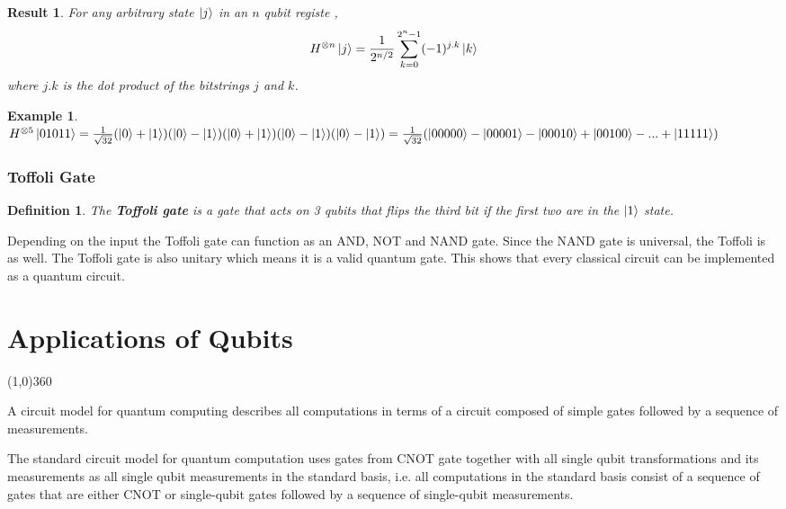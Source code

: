 \documentclass[12pt,twoside,fleqn]{report}
\theoremstyle{thmstyle}
\newtheorem{defn}{Definition}[chapter]
\newtheorem{eg}{Example}[chapter]
\newtheorem{result}{Result}[chapter]
\begin{document}
\begin{result}
    For any arbitrary state $\ket{j}$ in an $n$ qubit registe , \[ H^{\otimes n} \ket{j} = \frac{1}{2^{n/2}} \sum_{k=0}^{2^n-1} (-1)^{j.k} \ket{k}\] where $j.k$ is the dot product of the bitstrings $j$ and $k$.
\end{result}

\begin{eg}
    $H^{\otimes 5} \ket{01011} = \frac{1}{\sqrt{32}} (\ket{0} + \ket{1}) (\ket{0} - \ket{1}) (\ket{0} + \ket{1}) (\ket{0} - \ket{1}) (\ket{0} - \ket{1}) = \frac{1}{\sqrt{32}} ( \ket{00000} - \ket{00001} - \ket{00010} + \ket{00100} - ... + \ket{11111} )$
\end{eg}

\subsection{Toffoli Gate}
\begin{defn}
    The \textbf{Toffoli gate} is a gate that acts on 3 qubits that flips the third bit if the first two are in the $\ket{1}$ state.\\
\end{defn}

Depending on the input the Toffoli gate can function as an AND, NOT and NAND gate. Since the NAND gate is universal, the Toffoli is as well. The Toffoli gate is also unitary which means it is a valid quantum gate. This shows that every classical circuit can be implemented as a quantum circuit.



\chapter{Applications of Qubits}

\line(1,0){360} \\

\begin{comment}
To include:
* Quantum Teleportaion
* Quantum Algorithms can be abstracted as circuits, and these circuits can be represented as a product of matrices
* For any classical circuit, there exists a quantum circuit that performs the computation with similar efficiency
\end{comment}

A circuit model for quantum computing describes all computations in terms of a circuit composed of simple gates followed by a sequence of measurements.

The standard circuit model for quantum computation uses gates from { CNOT gate together with all single qubit transformations} and its measurements as all single qubit measurements in the standard basis, i.e. all computations in the standard basis consist of a sequence of gates that are either CNOT or single-qubit gates followed by a sequence of single-qubit measurements.
\end{document}
